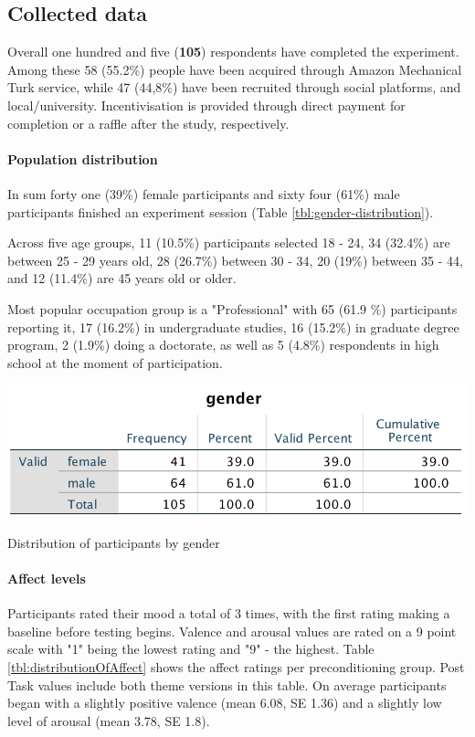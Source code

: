 	\subsection{Collected data}
	
	Overall one hundred and five (\textbf{105}) respondents have completed the experiment. Among these 58 (55.2\%) people have been acquired through Amazon Mechanical Turk service, while 47 (44,8\%) have been recruited through social platforms, and local/university. Incentivisation is provided through direct payment for completion or a raffle after the study, respectively.
	
	\paragraph{Population distribution}
	
	In sum forty one (39\%) female participants and sixty four (61\%) male participants finished an experiment session (Table \ref{tbl:gender-distribution}).
	 
	Across five age groups, 11 (10.5\%) participants selected 18 - 24, 34 (32.4\%) are between 25 - 29  years old, 28 (26.7\%) between 30 - 34, 20 (19\%) between 35 - 44, and 12 (11.4\%) are 45 years old or older.
	
	Most popular occupation group is a "Professional" with 65 (61.9 \%) participants reporting it, 17 (16.2\%) in undergraduate studies, 16 (15.2\%) in graduate degree program, 2 (1.9\%) doing a doctorate, as well as 5 (4.8\%) respondents in high school at the moment of participation.
	
\begin{table}[h!]
	\centering
	\includegraphics[width=0.7\linewidth]{graphics/Gender-distribution}
	\caption{Distribution of participants by gender}
	\label{tbl:gender-distribution}
\end{table}
	
	\paragraph{Affect levels} Participants rated their mood a total of 3 times, with the first rating making a baseline before testing begins. Valence and arousal values are rated on a 9 point scale with "1" being the lowest rating and "9" - the highest. Table \ref{tbl:distributionOfAffect} shows the affect ratings per preconditioning group. Post Task values include both theme versions in this table. On average participants began with a slightly positive valence (mean 6.08, SE 1.36) and a slightly low level of arousal (mean 3.78, SE 1.8).
	
